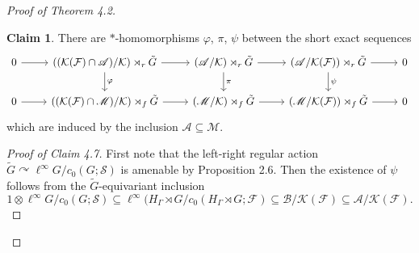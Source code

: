 \documentclass{amsart}
\theoremstyle{definition}
\newtheorem{claim}[theorem]{Claim}
\renewcommand{\subset}{\subseteq}
\newcommand{\action}{\curvearrowright}
\begin{document}
\begin{proof}[Proof of Theorem 4.2]
\begin{claim}
There are $\ast$-homomorphisms $\varphi$, $\pi$, $\psi$ between the short exact sequences
\[
\begin{tikzcd}
  0 \arrow[r] 
    & ((\mathcal{K}(\mathcal{F})\cap \mathscr{A})/\mathcal{K})\rtimes_r \tilde{G} \arrow[r] \arrow[d, "\varphi"]
    & (\mathscr{A}/\mathcal{K})\rtimes_r \tilde{G} \arrow[r] \arrow[d, "\pi"]
    & (\mathscr{A}/\mathcal{K}(\mathcal{F}))\rtimes_r \tilde{G} \arrow[r] \arrow[d, "\psi"]
    & 0 \\
  0 \arrow[r]
    & ((\mathcal{K}(\mathcal{F})\cap \mathscr{M})/\mathcal{K})\rtimes_f \tilde{G} \arrow[r]
    & (\mathscr{M}/\mathcal{K})\rtimes_f \tilde{G} \arrow[r]
    & (\mathscr{M}/\mathcal{K}(\mathcal{F}))\rtimes_f \tilde{G} \arrow[r]
    & 0
\end{tikzcd}
\]
which are induced by the inclusion $\mathscr{A}\subseteq \mathscr{M}$. 
\end{claim}
\begin{proof}[Proof of Claim 4.7]
First note that the left-right regular action 
$\tilde{G} \action \ell^{\infty}G/c_0(G;\mathcal{S})$ 
is amenable by Proposition 2.6. 
Then the existence of $\psi$ follows from the $\tilde{G}$-equivariant inclusion
\[
1 \otimes \ell^{\infty}G/c_0(G;\mathcal{S})
\subset \ell^{\infty}(H_{\Gamma}\rtimes G/c_0(H_{\Gamma}\rtimes G;\mathcal{F}) 
\subset \mathscr{B}/\mathcal{K}(\mathcal{F})
\subset \mathscr{A}/\mathcal{K}(\mathcal{F}). 
\]


\end{proof}
\end{proof}
\end{document}
